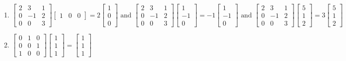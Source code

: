 \documentclass[12pt]{article}
\begin{document}
\begin{enumerate}
  \item $\begin{bmatrix} 2 & 3 & 1\\ 0 & -1 & 2\\ 0 & 0 & 3\end{bmatrix}\begin{bmatrix} 1 & 0 & 0\end{bmatrix}=2\begin{bmatrix} 1\\0\\0\end{bmatrix}\text{ and }\begin{bmatrix} 2 & 3 & 1\\ 0 & -1 & 2\\ 0 & 0 & 3\end{bmatrix}\begin{bmatrix} 1\\-1\\0\end{bmatrix}=-1\begin{bmatrix} 1\\-1\\0\end{bmatrix}\text{ and }\begin{bmatrix} 2 & 3 & 1\\ 0 & -1 & 2\\ 0 & 0 & 3\end{bmatrix}\begin{bmatrix}5\\1\\2 \end{bmatrix}=3\begin{bmatrix}5\\1\\2\end{bmatrix}$

    \setcounter{enumi}{4}

  \item $\begin{bmatrix} 0 & 1 & 0\\ 0 & 0 & 1\\ 1 & 0 & 0\end{bmatrix}\begin{bmatrix} 1\\1\\1\end{bmatrix}=\begin{bmatrix}1\\1\\1\end{bmatrix}$


\end{enumerate}
\end{document}
